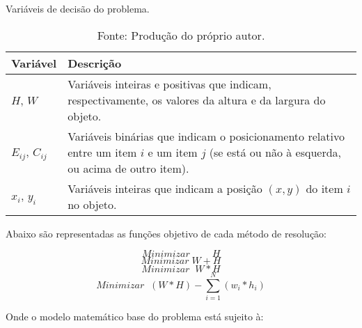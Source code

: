         \begin{table}[htbp]
            \renewcommand{\arraystretch}{1.3}   %
            \centering
            \footnotesize
            \caption{Variáveis de decisão do problema.}     %
            \begin{tabular}{ l p{11cm}}
                \hline
                \textbf{Variável}       &   \textbf{Descrição}  \\
                \hline
                ${H}$, ${W}$            &   Variáveis inteiras e positivas que indicam, respectivamente, os valores da altura e da largura do objeto.  \\
                $E_{ij}$, $C_{ij}$      &   Variáveis binárias que indicam o posicionamento relativo entre um item ${i}$ e um item ${j}$ (se está ou não à esquerda, ou acima de outro item). \\
                ${x}_i$, ${y}_i$        &   Variáveis inteiras que indicam a posição ${(x, y)}$ do item ${i}$ no objeto.    \\
                \hline
            \end{tabular}
            \caption*{Fonte: Produção do próprio autor.}    %
            \label{Tab-Variaveis-de-decisao}
        \end{table}

        \newpage
        Abaixo são representadas as funções objetivo de cada método de resolução:
    
        \begin{equation}
            Minimizar \; \qquad H   \label{eqn:fo1}
        \end{equation}
        \begin{equation}
            Minimizar \; W + H  \label{eqn:fo2}
        \end{equation}
        \begin{equation}
            Minimizar \; \; W * H  \label{eqn:fo3}
        \end{equation}
        \begin{equation}
            Minimizar \; \; (W * H) - \sum_{i=1}^N (w_{i} * h_{i})   \label{eqn:fo4}
        \end{equation}
        
        Onde o modelo matemático base do problema está sujeito à:
    
